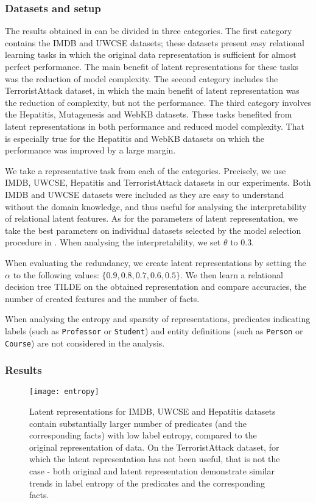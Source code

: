 \subsubsection{Datasets and setup}

The results  obtained in \cite{Dumancic2017} can be divided in three categories.
The first category contains the IMDB and UWCSE datasets; these datasets present easy relational learning tasks in which the original data representation is sufficient for almost perfect performance.
The main benefit of latent representations for these tasks was the reduction of model complexity.
The second category includes the TerroristAttack dataset, in which the main benefit of latent representation was the reduction of complexity, but not the performance.
The third category involves the Hepatitis, Mutagenesis and WebKB datasets.
These tasks benefited from latent representations in both performance and reduced model complexity.
That is especially true for the Hepatitis and WebKB datasets on which the performance was improved by a large margin.


We take a representative task from each of the categories.
Precisely, we use IMDB, UWCSE, Hepatitis and TerroristAttack datasets in our experiments.
Both IMDB and UWCSE datasets were included as they are easy to understand without the domain knowledge, and thus useful for analysing the interpretability of relational latent features.
As for the parameters of latent representation, we take the best parameters on individual datasets selected by the model selection procedure in \cite{Dumancic2017}.
When analysing the interpretability, we set $\theta$ to $0.3$.

When evaluating the redundancy, we create latent representations by setting the $\alpha$ to the following values: $\{0.9, 0.8, 0.7, 0.6, 0.5\}$.
We then learn a relational decision tree TILDE \cite{Blockeel1998285} on the obtained representation and compare accuracies, the number of created features and the number of facts.


When analysing the entropy and sparsity of representations, predicates indicating labels (such as \texttt{Professor} or \texttt{Student}) and entity definitions (such as \texttt{Person} or \texttt{Course}) are not considered in the analysis.


\subsubsection{Results}


\begin{figure}[t]
	\centering
	\medskip
    \texttt{[image: entropy]}
    \caption{Latent representations for IMDB, UWCSE and Hepatitis datasets contain substantially larger number of predicates (and the corresponding facts) with low label entropy, compared to the original representation of data. On the TerroristAttack dataset, for which the latent representation has not been useful, that is not the case - both original and latent representation demonstrate similar trends in label entropy of the predicates and the corresponding facts.}
    \label{fig:Entropy}
\end{figure}


